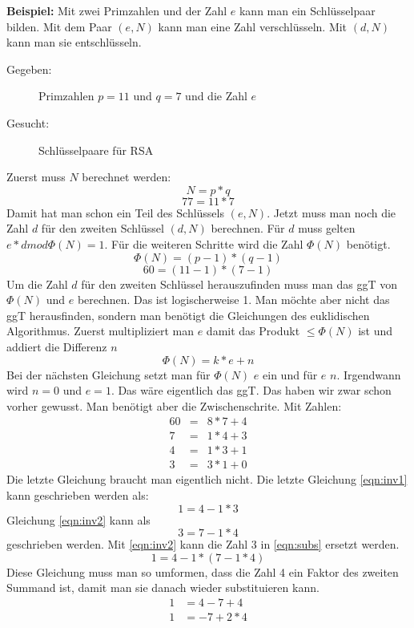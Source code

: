 \textbf{Beispiel:}
Mit zwei Primzahlen und der Zahl $e$ kann man ein Schlüsselpaar bilden. Mit dem
Paar $(e,N)$ kann man eine Zahl verschlüsseln. Mit $(d,N)$ kann man sie
entschlüsseln.
\begin{description}
\item[Gegeben:] Primzahlen $p=11$ und $q=7$ und die Zahl $e$
\item[Gesucht: ] Schlüsselpaare für RSA
\end{description}
Zuerst muss $N$ berechnet werden:
\[
N = p*q
\]
\[
77 = 11*7
\]
Damit hat man schon ein Teil des Schlüssels $(e,N)$. Jetzt muss man noch die
Zahl $d$ für den zweiten Schlüssel $(d,N)$ berechnen. Für $d$ muss gelten $e*d
mod \Phi(N) = 1$. Für die weiteren Schritte wird die Zahl $\Phi(N)$ benötigt.
\[
\Phi(N) = (p-1) * (q-1)
\]
\[
60 = (11-1) * (7-1)
\]
Um die Zahl $d$ für den zweiten Schlüssel herauszufinden muss man das ggT von
$\Phi(N)$ und $e$ berechnen. Das ist logischerweise 1. Man möchte aber nicht das
ggT herausfinden, sondern man benötigt die Gleichungen des euklidischen
Algorithmus. Zuerst multipliziert man $e$ damit das Produkt $\leq \Phi(N)$ ist
und addiert die Differenz $n$
\[
\Phi(N) = k * e + n
\]
Bei der nächsten Gleichung setzt man für $\Phi(N)$ $e$ ein und für $e$ $n$.
Irgendwann wird $n=0$ und $e=1$. Das wäre eigentlich das ggT. Das haben wir zwar
schon vorher gewusst. Man benötigt aber die Zwischenschrite. Mit Zahlen:
\begin{eqnarray}
\label{eqn:inv3}
60 & = & 8 * 7 + 4 \\
\label{eqn:inv2}
7 & = & 1 * 4 + 3\\
\label{eqn:inv1}
4 & = & 1 * 3 + 1\\
3 & = & 3 * 1 + 0
\end{eqnarray}
Die letzte Gleichung braucht man eigentlich nicht. Die letzte Gleichung
\ref{eqn:inv1} kann geschrieben werden als:
\begin{equation}
\label{eqn:subs}
1 = 4 - 1*3
\end{equation}
Gleichung \ref{eqn:inv2} kann als
\[
3 = 7 - 1*4
\]
geschrieben werden.
Mit \ref{eqn:inv2} kann die Zahl 3 in \ref{eqn:subs} ersetzt werden.  
\begin{equation}
1 = 4 - 1*(7-1*4)
\end{equation}
Diese Gleichung muss man so umformen, dass die Zahl 4 ein Faktor des zweiten
Summand ist, damit man sie danach wieder substituieren kann.
\begin{align}
1 &= 4 - 7+4 \\
1 &= -7 + 2*4
\end{align}
